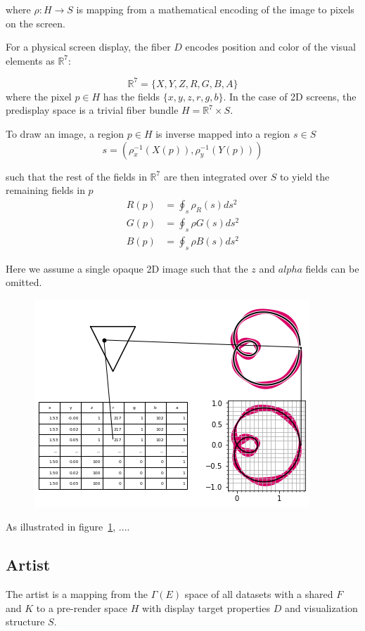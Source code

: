 \documentclass[../main.tex]{subfiles}
\begin{document}
where $\rho: H \rightarrow S$ is mapping from a mathematical encoding of the image to pixels on the screen. 

For a physical screen display, the fiber $D$ encodes position and color of the visual elements as $\mathbb{R}^{7}$:

\begin{equation}
    \mathbb{R}^{7} = \{X, Y, Z, R, G, B, A\}
\end{equation}
where the pixel $p \in H$ has the fields $\{x, y, z, r, g, b\}$. In the case of 2D screens, the predisplay space is a trivial fiber bundle $H=\mathbb{R}^{7}\times S$.

To draw an image, a region $p \in H$ is inverse mapped into a region $s \in S$
\begin{equation}
s = (\rho_{x}^{-1}(X(p)), \rho_{y}^{-1}(Y(p)))
\end{equation}

such that the rest of the fields in $\mathbb{R}^{7}$ are then integrated over $S$ to yield the remaining fields in $p$
\begin{align}
    R(p) &= \oint_s \rho_R(s)ds^{2}\\
    G(p) &= \oint_s \rho G(s)ds^{2}\\
    B(p) &= \oint_s \rho B(s)ds^{2}
\end{align}

Here we assume a single opaque 2D image such that the $z$ and $alpha$ fields can be omitted. 

\begin{figure}[h]
    \includegraphics[width=.4\linewidth]{figures/sections/math/render.png}
    \caption{}
    \label{fig:render}
\end{figure}

As illustrated in figure~\ref{fig:render}, ....


\subsection{Artist}
The artist is a mapping from the $\Gamma(E)$ space of all datasets with a shared $F$ and $K$ to a pre-render space $H$ with display target properties $D$ and visualization structure $S$. 
\end{document}

